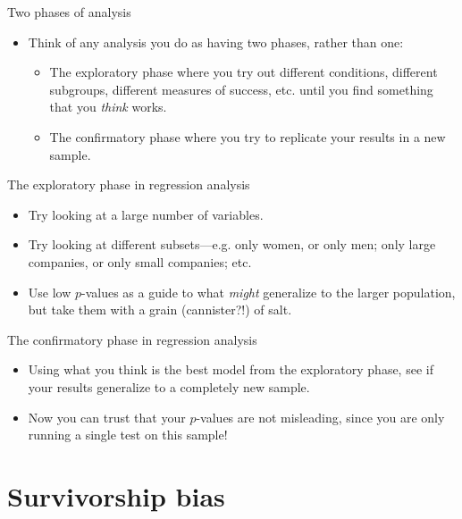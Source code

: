 \documentclass{beamer}\usepackage[]{graphicx}\usepackage[]{color}
\begin{document}
\begin{darkframes}
    \begin{frame}{Two phases of analysis}
      \begin{itemize}
        \item Think of any analysis you do as having two phases, rather than one:
          \begin{itemize}
            \item The \alert{exploratory phase} where you try out different conditions, different subgroups, different measures of success, etc. until you find something that you \emph{think} works.
            \item The \alert{confirmatory phase} where you try to replicate your results in a new sample.
          \end{itemize}
      \end{itemize}
    \end{frame}

    \begin{frame}{The exploratory phase in regression analysis}
      \begin{itemize}
        \item Try looking at a large number of variables.
        \item Try looking at different subsets---e.g. only women, or only men; only large companies, or only small companies; etc.
        \item Use low $p$-values as a guide to what \emph{might} generalize to the larger population, but take them with a grain (cannister?!) of salt.
      \end{itemize}
    \end{frame}

    \begin{frame}{The confirmatory phase in regression analysis}
      \begin{itemize}
        \item Using what you think is the best model from the exploratory phase, see if your results generalize to a completely new sample.
        \item Now you can trust that your $p$-values are not misleading, since you are only running a single test on this sample!
      \end{itemize}
    \end{frame}

    \section{Survivorship bias}


\end{darkframes}
\end{document}
